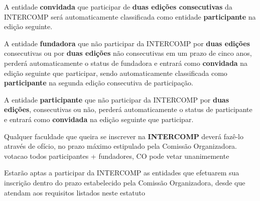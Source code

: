 \begin{article}
	\begin{xparagraph}
		A entidade \textbf{convidada} que participar de \textbf{duas edições consecutivas} da INTERCOMP será automaticamente classificada como entidade \textbf{participante} na edição seguinte.
	\end{xparagraph}

	\begin{xparagraph}
		A entidade \textbf{fundadora} que não participar da INTERCOMP por \textbf{duas edições} consecutivas ou por \textbf{duas edições} não consecutivas em um prazo de cinco anos, perderá automaticamente o status de fundadora e entrará como \textbf{convidada} na edição seguinte que participar, sendo automaticamente classificada como \textbf{participante} na segunda edição consecutiva de participação.
	\end{xparagraph}

	\begin{xparagraph}
		A entidade \textbf{participante} que não participar da INTERCOMP por \textbf{duas edições}, consecutivas ou não, perderá automaticamente o status de participante e entrará como \textbf{convidada} na edição seguinte que participar.
	\end{xparagraph}
\end{article}

\begin{article}
	Qualquer faculdade que queira se inscrever na \textbf{INTERCOMP} deverá fazê-lo através de ofício, no prazo máximo estipulado pela Comissão Organizadora.
	votacao todos participantes + fundadores, CO pode vetar unanimemente
\end{article}

\begin{article}
	Estarão aptas a participar da INTERCOMP as entidades que efetuarem sua inscrição dentro do prazo estabelecido pela Comissão Organizadora, desde que atendam aos requisitos listados neste estatuto
\end{article}
